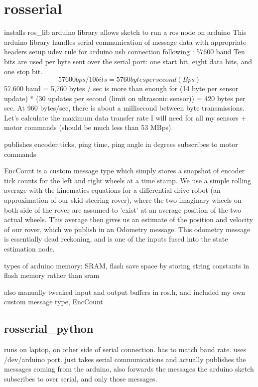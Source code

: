 \section{rosserial} \label{sectionRosSerial}
installs ros\_lib arduino library
allows sketch to run a ros node on arduino
This arduino library handles serial communication of message data with appropriate headers
setup udev rule for arduino usb connection following : %
57600 baud
Ten bits are used per byte sent over the serial port: one start bit, eight data bits, and one stop bit. \[57600 bps / 10 bits = 5760 bytes per second (Bps)\]
57,600 baud = 5,760 bytes / sec is more than enough for (14 byte per sensor update) * (30 updates per second (limit on ultrasonic sensor)) = 420 bytes per sec. At 960 bytes/sec, there is about a millisecond between byte transmissions. 
Let’s calculate the maximum data transfer rate I will need for all my sensors + motor commands (should be much less than 53 MBps).

publishes encoder ticks, ping time, ping angle in degrees
subscribes to motor commands

EncCount is a custom message type which simply stores a snapshot of encoder
tick counts for the left and right wheels at a time stamp. We use a simple
rolling average with the kinematics equations for a differential drive
robot (an approximation of our skid-steering rover), where the two imaginary
wheels on both side of the rover are assumed to 'exist' at an average position
of the two actual wheels. This average then gives us an estimate of the
position and velocity of our rover, which we publish in an Odometry message.
This odometry message is essentially dead reckoning, and is one of the inputs
fused into the state estimation node. 

types of arduino memory: SRAM, flash
save space by storing string constants in flash memory rather than sram

also manually tweaked input and output buffers in ros.h, and included my own custom message type, EncCount

\subsection{rosserial\_python}
runs on laptop, on other side of serial connection. has to match baud rate. uses /dev/arduino port. just takes serial communications and actually publishes the messages coming from the arduino, also forwards the messages the arduino sketch subscribes to over serial, and only those messages.


